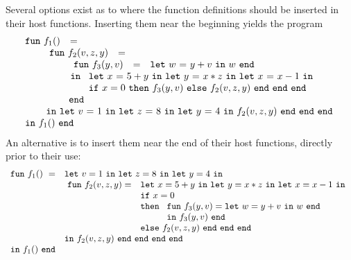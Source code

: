Several options exist as to where the function definitions should be
inserted in their host functions.  Inserting them near the beginning yields the
program 
$$
\begin{array}{l}
  \begin{array}{lcl}\mathtt{fun}\ f_1() & = & \end{array}\\
  \qquad
   \begin{array}[t]{l} 
     \begin{array}{lcl}\mathtt{fun}\ f_2(v,z,y) & = & \end{array}\\
     \qquad \begin{array}{l}  
             \begin{array}{lcl}\mathtt{fun}\ f_3(y,v) & = & \letin w {y+v} w\end{array}\\
             \, \mathtt{in}\
              \begin{array}[t]{l}
                \letinD x {5+y} {
                  \letinD y {x*z} {
                   \letinD x {x-1} {}}}\\ 
                  \ite {x=0} {\call {f_3} {y,v}}
                     {\call {f_2} {v,z,y}}\ \mathtt{end}\ \mathtt{end}\ \mathtt{end}
              \end{array}\\
             \mathtt{end}
           \end{array}\\
     \, \mathtt{in}\ \letin v 1 {
              \letin z 8 {
                 \letin y 4 {\call {f_2} {v,z,y}}
              }
            }
   \end{array}\\
\begin{array}{lcl}
  \mathtt{in}\ f_1()\ \mathtt{end}
\end{array} 
\end{array}
$$ 
An alternative is to insert them near the end of their host
functions, directly prior to their use: 
$$
\begin{array}{ll}
\mathtt{fun}\ f_1()\ = & \mathtt{let}\ v = 1 \ 
                  \mathtt{in\ let}\ z = 8 \ 
                  \mathtt{in\ let}\ y = 4\ \mathtt{in}\\
&\! \begin{array}{ll}
     \mathtt{fun}\ f_2(v,z,y) = &
     \mathtt{let}\ x = 5+y\
     \mathtt{in\ let}\ y = x*z\
     \mathtt{in\ let}\ x = x-1\ \mathtt{in}\\
   & \mathtt{if}\ x=0\\ 
   &  \mathtt{then}\ 
      \begin{array}[t]{l}
         \mathtt{fun}\ f_3(y,v) = 
         \mathtt{let}\ w = y+v\ \mathtt{in}\ w\ \mathtt{end}\\
         \mathtt{in}\ f_3(y,v)\ \mathtt{end}
      \end{array}\\
   & \mathtt{else}\ f_2(v,z,y)\ \mathtt{end\ end\ end}
  \end{array}\\
& \mathtt{in}\ f_2(v,z,y)\ \mathtt{end\ end\ end\ end}\\
\mathtt{in}\ f_1()\  \mathtt{end}
\end{array}
$$
